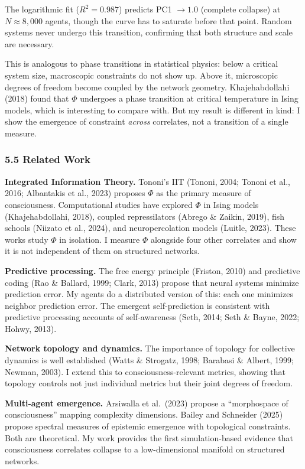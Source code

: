 \documentclass[
  11pt,
]{article}
\begin{document}
The logarithmic fit (\(R^2 = 0.987\)) predicts PC1 \(\to 1.0\) (complete
collapse) at \(N \approx 8{,}000\) agents, though the curve has to
saturate before that point. Random systems never undergo this
transition, confirming that both structure and scale are necessary.

This is analogous to phase transitions in statistical physics: below a
critical system size, macroscopic constraints do not show up. Above it,
microscopic degrees of freedom become coupled by the network geometry.
Khajehabdollahi (2018) found that \(\Phi\) undergoes a phase transition
at critical temperature in Ising models, which is interesting to compare
with. But my result is different in kind: I show the emergence of
constraint \emph{across} correlates, not a transition of a single
measure.

\subsubsection{5.5 Related Work}\label{related-work}

\textbf{Integrated Information Theory.} Tononi's IIT (Tononi, 2004;
Tononi et al., 2016; Albantakis et al., 2023) proposes \(\Phi\) as the
primary measure of consciousness. Computational studies have explored
\(\Phi\) in Ising models (Khajehabdollahi, 2018), coupled repressilators
(Abrego \& Zaikin, 2019), fish schools (Niizato et al., 2024), and
neuropercolation models (Luitle, 2023). These works study \(\Phi\) in
isolation. I measure \(\Phi\) alongside four other correlates and show
it is not independent of them on structured networks.

\textbf{Predictive processing.} The free energy principle (Friston,
2010) and predictive coding (Rao \& Ballard, 1999; Clark, 2013) propose
that neural systems minimize prediction error. My agents do a
distributed version of this: each one minimizes neighbor prediction
error. The emergent self-prediction is consistent with predictive
processing accounts of self-awareness (Seth, 2014; Seth \& Bayne, 2022;
Hohwy, 2013).

\textbf{Network topology and dynamics.} The importance of topology for
collective dynamics is well established (Watts \& Strogatz, 1998;
Barabasi \& Albert, 1999; Newman, 2003). I extend this to
consciousness-relevant metrics, showing that topology controls not just
individual metrics but their joint degrees of freedom.

\textbf{Multi-agent emergence.} Arsiwalla et al.~(2023) propose a
``morphospace of consciousness'' mapping complexity dimensions. Bailey
and Schneider (2025) propose spectral measures of epistemic emergence
with topological constraints. Both are theoretical. My work provides the
first simulation-based evidence that consciousness correlates collapse
to a low-dimensional manifold on structured networks.
\end{document}

